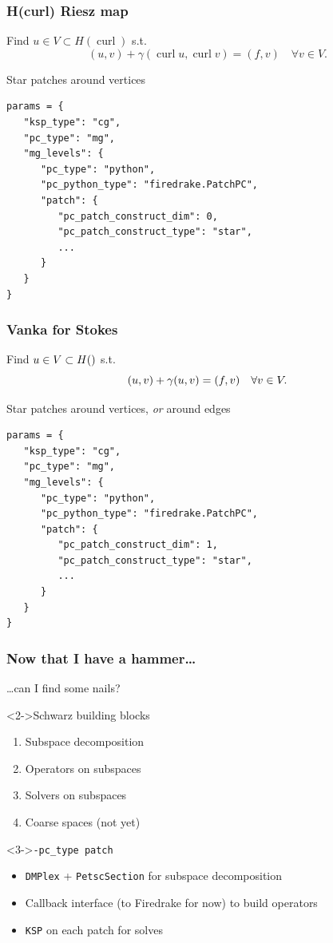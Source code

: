 \documentclass[presentation,aspectratio=43]{beamer}
\let\div\relax
\DeclareMathOperator{\div}{div}
\DeclareMathOperator{\curl}{curl}
\begin{document}
\begin{frame}[fragile]
  \frametitle{H(curl) Riesz map}
  Find $u \in V \subset H(\curl)$ s.t.
  \begin{equation*}
    (u, v) + \gamma (\curl u, \curl v) = (f, v) \quad \forall v \in V.
  \end{equation*}

  Star patches around vertices
\begin{verbatim}
params = {
   "ksp_type": "cg",
   "pc_type": "mg",
   "mg_levels": {
      "pc_type": "python",
      "pc_python_type": "firedrake.PatchPC",
      "patch": {
         "pc_patch_construct_dim": 0,
         "pc_patch_construct_type": "star",
         ...
      }
   }
}
\end{verbatim}
\end{frame}

\begin{frame}[fragile]
  \frametitle{Vanka for Stokes}
  Find $u \in V \subset H(\div)$ s.t.
  \begin{equation*}
    (u, v) + \gamma (\div u, \div v) = (f, v) \quad \forall v \in V.
  \end{equation*}

  Star patches around vertices, \emph{or} around edges
\begin{verbatim}
params = {
   "ksp_type": "cg",
   "pc_type": "mg",
   "mg_levels": {
      "pc_type": "python",
      "pc_python_type": "firedrake.PatchPC",
      "patch": {
         "pc_patch_construct_dim": 1,
         "pc_patch_construct_type": "star",
         ...
      }
   }
}
\end{verbatim}
\end{frame}

\begin{frame}
  \frametitle{Now that I have a hammer\ldots}
  \ldots can I find some nails?

  \begin{block}<2->{Schwarz building blocks}
    \begin{enumerate}
    \item Subspace decomposition
    \item Operators on subspaces
    \item Solvers on subspaces
    \item Coarse spaces (not yet)
    \end{enumerate}
  \end{block}

  \begin{block}<3->{\texttt{-pc\_type patch}}
    \begin{itemize}
    \item \texttt{DMPlex} + \texttt{PetscSection} for subspace decomposition
    \item Callback interface (to Firedrake for now) to build operators
    \item \texttt{KSP} on each patch for solves
    \end{itemize}
  \end{block}
\end{frame}
\end{document}
